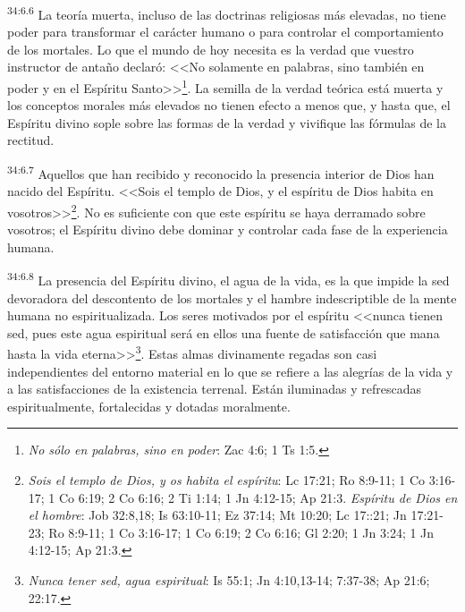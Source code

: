 \par
\textsuperscript{34:6.6} La teoría muerta, incluso de las doctrinas religiosas más elevadas, no tiene poder para transformar el carácter humano o para controlar el comportamiento de los mortales. Lo que el mundo de hoy necesita es la verdad que vuestro instructor de antaño declaró: <<No solamente en palabras, sino también en poder y en el Espíritu Santo>>\footnote{\textit{No sólo en palabras, sino en poder}: Zac 4:6; 1 Ts 1:5.}. La semilla de la verdad teórica está muerta y los conceptos morales más elevados no tienen efecto a menos que, y hasta que, el Espíritu divino sople sobre las formas de la verdad y vivifique las fórmulas de la rectitud.

\par
\textsuperscript{34:6.7} Aquellos que han recibido y reconocido la presencia interior de Dios han nacido del Espíritu. <<Sois el templo de Dios, y el espíritu de Dios habita en vosotros>>\footnote{\textit{Sois el templo de Dios, y os habita el espíritu}: Lc 17:21; Ro 8:9-11; 1 Co 3:16-17; 1 Co 6:19; 2 Co 6:16; 2 Ti 1:14; 1 Jn 4:12-15; Ap 21:3. \textit{Espíritu de Dios en el hombre}: Job 32:8,18; Is 63:10-11; Ez 37:14; Mt 10:20; Lc 17::21; Jn 17:21-23; Ro 8:9-11; 1 Co 3:16-17; 1 Co 6:19; 2 Co 6:16; Gl 2:20; 1 Jn 3:24; 1 Jn 4:12-15; Ap 21:3.}. No es suficiente con que este espíritu se haya derramado sobre vosotros; el Espíritu divino debe dominar y controlar cada fase de la experiencia humana.

\par
\textsuperscript{34:6.8} La presencia del Espíritu divino, el agua de la vida, es la que impide la sed devoradora del descontento de los mortales y el hambre indescriptible de la mente humana no espiritualizada. Los seres motivados por el espíritu <<nunca tienen sed, pues este agua espiritual será en ellos una fuente de satisfacción que mana hasta la vida eterna>>\footnote{\textit{Nunca tener sed, agua espiritual}: Is 55:1; Jn 4:10,13-14; 7:37-38; Ap 21:6; 22:17.}. Estas almas divinamente regadas son casi independientes del entorno material en lo que se refiere a las alegrías de la vida y a las satisfacciones de la existencia terrenal. Están iluminadas y refrescadas espiritualmente, fortalecidas y dotadas moralmente.

